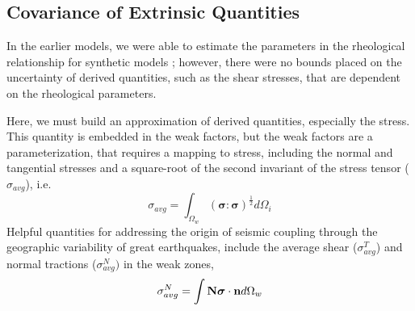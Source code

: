 \documentclass[12pt]{article}
\newcommand{\ssigma}{{\ensuremath{\boldsymbol{\sigma}}}}
\begin{document}
\subsection*{Covariance of Extrinsic Quantities}
 In the earlier models, 
we were able to estimate the parameters in the rheological relationship for synthetic models \citep{ratnaswamy2015adjoint}; 
however, there were no bounds placed on the uncertainty of derived quantities, such as the shear stresses, that are dependent on the rheological parameters.

 Here, we must build an approximation of derived quantities, especially the stress. This quantity is embedded in the weak factors, but the weak factors are a parameterization, that requires a mapping to stress,
including the normal and tangential stresses and a square-root of the second invariant of the stress tensor ($\sigma_{avg}$), i.e. 
\begin{equation}
\sigma_{avg} = \int_{\Omega_w} (\ssigma:\ssigma)^{\frac{1}{2}} d\Omega_i
\end{equation}
Helpful quantities for addressing the origin of seismic coupling through the geographic variability of great earthquakes, include the average shear ($\sigma^T_{avg}$) and normal tractions ($\sigma^N_{avg})$ in the weak zones,
\begin{equation}
\sigma^N_{avg} = \int \textbf N \ssigma\cdot\textbf n d\Omega_w
\end{equation}
\end{document}
